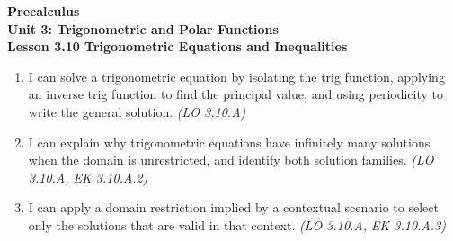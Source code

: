 \documentclass[10pt]{article}
\begin{document}
\vspace{-0.8in}

\begin{center}
  {\color{white}\textbf{\LARGE Precalculus}}\\[4pt]
  {\color{skymid}\large\textbf{Unit 3: Trigonometric and Polar Functions}}\\[6pt]
  {\color{white}\textbf{\large Lesson 3.10 \quad Trigonometric Equations and Inequalities}}
\end{center}

\vspace{0.22in}
\namedateperiod
\vspace{0.18in}

\begin{learningtargetbox}
\small
\begin{enumerate}[leftmargin=1.5em, itemsep=5pt]
  \item I can solve a trigonometric equation by isolating the trig function,
    applying an inverse trig function to find the principal value, and using
    periodicity to write the general solution. \hfill\textit{(LO 3.10.A)}
  \item I can explain why trigonometric equations have infinitely many solutions
    when the domain is unrestricted, and identify both solution families.
    \hfill\textit{(LO 3.10.A, EK 3.10.A.2)}
  \item I can apply a domain restriction implied by a contextual scenario to
    select only the solutions that are valid in that context.
    \hfill\textit{(LO 3.10.A, EK 3.10.A.3)}
\end{enumerate}
\end{learningtargetbox}

\vspace{0.14in}
\end{document}
